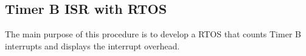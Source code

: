 \subsection{Timer B ISR with RTOS}

The main purpose of this procedure is to develop a RTOS that counts Timer B interrupts and displays the interrupt overhead.